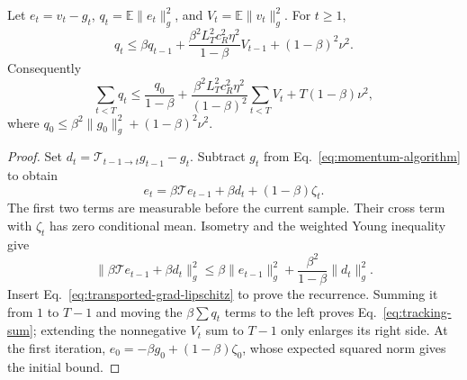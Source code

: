 \begin{lemma}
\label{lem:momentum-tracking}
Let $e_t=v_t-g_t$, $q_t=\mathbb E\|e_t\|_g^2$, and
$V_t=\mathbb E\|v_t\|_g^2$. For $t\geq1$,
\begin{equation}
 q_t\leq\beta q_{t-1}+
 \frac{\beta^2L_T^2c_R^2\eta^2}{1-\beta}V_{t-1}
 +(1-\beta)^2\nu^2.
 \label{eq:tracking-recursion}
\end{equation}
Consequently
\begin{equation}
 \sum_{t<T}q_t\leq\frac{q_0}{1-\beta}+
 \frac{\beta^2L_T^2c_R^2\eta^2}{(1-\beta)^2}
       \sum_{t<T}V_t+T(1-\beta)\nu^2,
 \label{eq:tracking-sum}
\end{equation}
where $q_0\leq\beta^2\|g_0\|_g^2+(1-\beta)^2\nu^2$.
\end{lemma}
\begin{proof}
Set $d_t=\mathcal T_{t-1\to t}g_{t-1}-g_t$. Subtract $g_t$ from
Eq.~\eqref{eq:momentum-algorithm} to obtain
\begin{equation}
 e_t=\beta\mathcal T e_{t-1}+\beta d_t+(1-\beta)\zeta_t.
\end{equation}
The first two terms are measurable before the current sample. Their cross
term with $\zeta_t$ has zero conditional mean. Isometry and the weighted
Young inequality give
\begin{equation}
 \|\beta\mathcal T e_{t-1}+\beta d_t\|_g^2
 \leq\beta\|e_{t-1}\|_g^2+
       \frac{\beta^2}{1-\beta}\|d_t\|_g^2.
\end{equation}
Insert Eq.~\eqref{eq:transported-grad-lipschitz} to prove the recurrence.
Summing it from $1$ to $T-1$ and moving the $\beta\sum q_t$ terms to
the left proves Eq.~\eqref{eq:tracking-sum}; extending the nonnegative
$V_t$ sum to $T-1$ only enlarges its right side. At the first iteration,
$e_0=-\beta g_0+(1-\beta)\zeta_0$, whose expected squared norm gives
the initial bound.
\end{proof}

